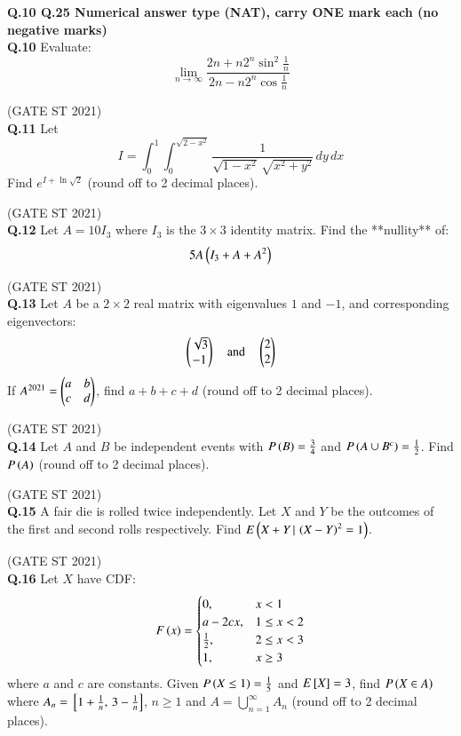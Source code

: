 \documentclass[journal,12pt,onecolumn]{IEEEtran}
\theoremstyle{remark}
\begin{document}
\textbf{Q.10 \text{-} Q.25 Numerical answer type (NAT), carry ONE mark each (no negative marks)} \\
 \textbf{Q.10}
Evaluate:
\[
\lim_{n \to \infty} \frac{2n + n 2^n \sin^2\frac{1}{n}}{2n - n 2^n \cos\frac{1}{n}}
\]

\hfill (GATE ST 2021) \\
\textbf{Q.11}
Let
\[
I = \int_{0}^{1} \int_{0}^{\sqrt{2 - x^2}} \frac{1}{\sqrt{1 - x^2} \, \sqrt{x^2 + y^2}} \, dy \, dx
\]
Find $e^{I + \ln{\sqrt{2}}}$ (round off to 2 decimal places).

\hfill (GATE ST 2021) \\

\textbf{Q.12}
Let $A = 10I_3$ where $I_3$ is the $3 \times 3$ identity matrix.  
Find the **nullity** of:
\[
5A \left(I_3 + A + A^2\right)
\]

\hfill (GATE ST 2021) \\

\textbf{Q.13}
Let $A$ be a $2 \times 2$ real matrix with eigenvalues $1$ and $-1$, and corresponding eigenvectors:
\[
\begin{pmatrix} \sqrt{3} \\ -1 \end{pmatrix}
\quad \text{and} \quad
\begin{pmatrix} 2 \\ 2 \end{pmatrix}
\]
If $A^{2021} = \begin{pmatrix} a & b \\ c & d \end{pmatrix}$,  
find $a+b+c+d$ (round off to 2 decimal places).

\hfill (GATE ST 2021) \\

\textbf{Q.14}
Let $A$ and $B$ be independent events with $P\left(B\right) = \frac{3}{4}$ and $P\left(A \cup B^c\right) = \frac12$.  
Find $P\left(A\right)$ (round off to 2 decimal places).

\hfill (GATE ST 2021) \\

\textbf{Q.15}
A fair die is rolled twice independently.  
Let $X$ and $Y$ be the outcomes of the first and second rolls respectively.  
Find $E\left(X + Y \, | \, \left(X - Y\right)^2 = 1\right)$.

\hfill (GATE ST 2021) \\

\textbf{Q.16}
Let $X$ have CDF:
\[
F\left(x\right) =
\begin{cases}
    
0, & x < 1 \\
a - 2c x, & 1 \le x < 2 \\
\frac12, & 2 \le x < 3 \\
1, & x \ge 3
\end{cases}
\]
where $a$ and $c$ are constants.  
Given $P\left(X \leq 1\right) = \frac15$ and $E{}\left[X\right] = 3$,  
find $P\left(X \in A\right)$ where $A_n = {}\left[1+\frac1n,\, 3 - \frac1n\right]$, $n \ge 1$ and $A = \bigcup_{n=1}^\infty A_n$ (round off to 2 decimal places).
\end{document}
